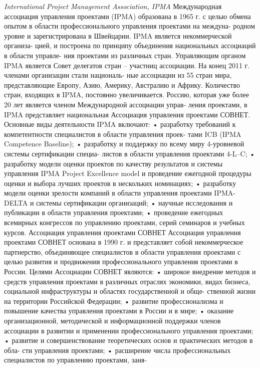 \textit{International Project Management Association, IPMA}
Международная ассоциация управления проектами (IPMA) образована в 1965 г.
с целью обмена опытом в области профессионального управления проектами на междуна-
родном уровне и зарегистрирована в Швейцарии. IPMA является некоммерческой организа-
цией, и построена по принципу объединения национальных ассоциаций в области управле-
ния проектами из различных стран. Управляющим органом IPMA является Совет делегатов
стран – участниц ассоциации. На конец 2011 г. членами организации стали националь-
ные ассоциации из 55 стран мира, представляющие Европу, Азию, Америку, Австралию и
Африку. Количество стран, входящих в IPMA, постоянно увеличивается.
Россию, которая уже более 20 лет является членом Международной ассоциации управ-
ления проектами, в IPMA представляет национальная Ассоциация управления проектами
СОВНЕТ.
Основные виды деятельности IPMA включают:
• разработку требований к компетентности специалистов в области управления проек-
тами ICB (IPMA Competence Baseline);
• разработку и поддержку по всему миру 4-уровневой системы сертификации специа-
листов в области управления проектами 4-L–C;
• разработку модели оценки проектов по качеству результатов и системы управления
IPMA Project Excellence model и проведение ежегодной процедуры оценки и выбора лучших
проектов в нескольких номинациях;
• разработку модели оценки зрелости компаний в области управления проектами
IPMA-DELTA и системы сертификации организаций;
• научные исследования и публикации в области управления проектами;
• проведение ежегодных всемирных конгрессов по управлению проектами, серий
семинаров и учебных курсов.
Ассоциация управления проектами СОВНЕТ
Ассоциация управления проектами СОВНЕТ основана в 1990 г. и представляет собой
некоммерческое партнерство, объединяющее специалистов в области управления проектами
с целью развития и продвижения профессионального управления проектами в России.
Целями Ассоциации СОВНЕТ являются:
• широкое внедрение методов и средств управления проектами в различных отраслях
экономики, видах бизнеса, социальной инфраструктуры и областях государственной и обще-
ственной жизни на территории Российской Федерации;
• развитие профессионализма и повышение качества управления проектами в России
и в мире;
• оказание организационной, методической и информационной поддержки членов
ассоциации в развитии и применении профессионального управления проектами;
• развитие и совершенствование теоретических основ и практических методов в обла-
сти управления проектами;
• расширение числа профессиональных специалистов по управлению проектами, заня-
